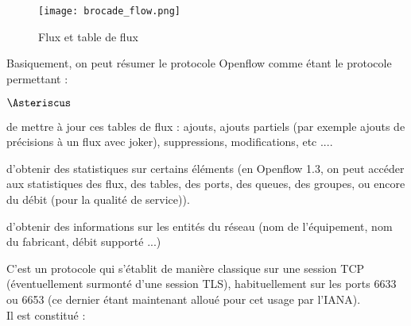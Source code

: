 \begin{figure}[h]
  	\centering
  	\texttt{[image: brocade\_flow.png]}
  	\caption{Flux et table de flux}
\end{figure}

Basiquement, on peut résumer le protocole Openflow comme étant le protocole permettant :
\begin{list}{$\Asteriscus$}{}

\item de mettre à jour ces tables de flux : ajouts, ajouts partiels (par exemple ajouts de précisions à un flux avec joker), suppressions, modifications, etc ....  

\item d'obtenir des statistiques sur certains éléments (en Openflow 1.3, on peut accéder aux statistiques des flux, des tables, des ports, des queues, des groupes, ou encore du débit (pour la qualité de service)).

\item d'obtenir des informations sur les entités du réseau (nom de l'équipement, nom du fabricant, débit supporté ...)

\end{list}

C'est un protocole qui s'établit de manière classique sur une session TCP (éventuellement surmonté d'une session TLS), habituellement sur les ports 6633 ou 6653 (ce dernier étant maintenant alloué pour cet usage par l'IANA).\\
Il est constitué :

